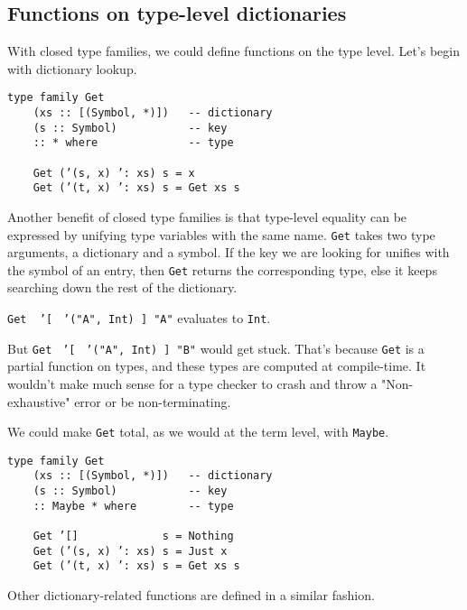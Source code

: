 \documentclass[pldi]{sigplanconf-pldi16}
\begin{document}
\subsection{Functions on type-level dictionaries}

With closed type families, we could define functions on the type level.
 Let's begin with dictionary lookup.

\begin{verbatim}
type family Get
    (xs :: [(Symbol, *)])   -- dictionary
    (s :: Symbol)           -- key
    :: * where              -- type

    Get (’(s, x) ’: xs) s = x
    Get (’(t, x) ’: xs) s = Get xs s
\end{verbatim}

Another benefit of closed type families is that type-level equality can be
expressed by unifying type variables with the same name.
\texttt{Get} takes two type arguments, a dictionary and a symbol.
If the key we are looking for unifies with the symbol of an entry, then
 \texttt{Get} returns the corresponding type, else it keeps
 searching down the rest of the dictionary.

\texttt{Get }\texttt{ '}\texttt{[ }
\texttt{'}\texttt{("A", Int) ] "A"} evaluates to
\texttt{Int}.

But \texttt{Get }
\texttt{'}\texttt{[ }
\texttt{'}\texttt{("A", Int) ] "B"} would get stuck.
That's because \texttt{Get} is a partial function on types,
 and these types are computed at compile-time. It wouldn't make
 much sense for a type checker to crash and throw a "Non-exhaustive" error or
 be non-terminating.

We could make \texttt{Get} total, as we would at the term level,
 with \texttt{Maybe}.

\begin{verbatim}
type family Get
    (xs :: [(Symbol, *)])   -- dictionary
    (s :: Symbol)           -- key
    :: Maybe * where        -- type

    Get ’[]             s = Nothing
    Get (’(s, x) ’: xs) s = Just x
    Get (’(t, x) ’: xs) s = Get xs s
\end{verbatim}
%
Other dictionary-related functions are defined in a similar fashion.
\end{document}
